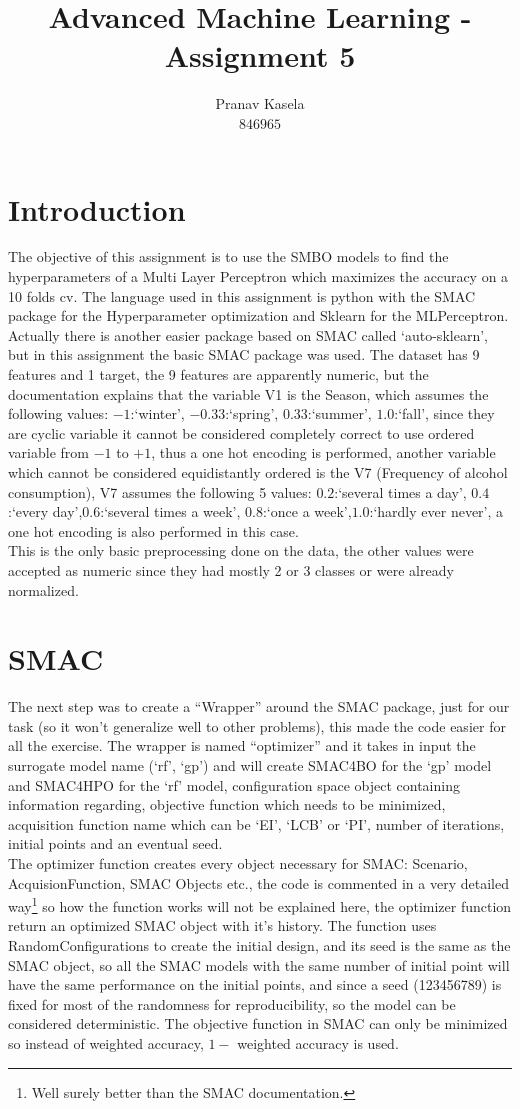 \documentclass[12pt, onecolumn]{article}
\title{Advanced Machine Learning - Assignment 5}
\author{Pranav Kasela \\$846965$}
\date{}
\begin{document}
\maketitle
\section*{Introduction}
The objective of this assignment is to use the SMBO models to find the hyperparameters of a Multi Layer Perceptron which maximizes the accuracy on a 10 folds cv.
The language used in this assignment is python with the SMAC package for the Hyperparameter optimization and Sklearn for the MLPerceptron.
Actually there is another easier package based on SMAC called `auto-sklearn', but in this assignment the basic SMAC package was used.
The dataset has 9 features and 1 target, the 9 features are apparently numeric, but the documentation explains that the variable V1 is the Season, which assumes the following values: $-1$:`winter', $-0.33$:`spring', $0.33$:`summer', $1.0$:`fall', since they are cyclic variable it cannot be considered completely correct to use ordered variable from $-1$ to $+1$, thus a one hot encoding is performed, another variable which cannot be considered equidistantly ordered is the V7 (Frequency of alcohol consumption), V7 assumes the following 5 values: $0.2$:`several times a day', $0.4$:`every day',$0.6$:`several times a week',  $0.8$:`once a week',$1.0$:`hardly ever never', a one hot encoding is also performed in this case.\\
This is the only basic preprocessing done on the data, the other values were accepted as numeric since they had mostly 2 or 3 classes or were already normalized.

\section*{SMAC}
The next step was to create a ``Wrapper'' around the SMAC package, just for our task (so it won't generalize well to other problems), this made the code easier for all the exercise.
The wrapper is named ``optimizer'' and it takes in input the surrogate model name (`rf', `gp') and will create SMAC4BO for the `gp' model and SMAC4HPO for the `rf' model, configuration space object containing information regarding, objective function which needs to be minimized, acquisition function name which can be `EI', `LCB' or `PI', number of iterations, initial points and an eventual seed.\\
The optimizer function creates every object necessary for SMAC: Scenario, AcquisionFunction, SMAC Objects etc., the code is commented in a very detailed way\footnote{Well surely better than the SMAC documentation.} so how the function works will not be explained here, the optimizer function return an optimized SMAC object with it's history.
The function uses RandomConfigurations to create the initial design, and its seed is the same as the SMAC object, so all the SMAC models with the same number of initial point will have the same performance on the initial points, and since a seed (123456789) is fixed for most of the randomness for reproducibility, so the model can be considered deterministic.
The objective function in SMAC can only be minimized so instead of weighted accuracy, $1 -$ weighted accuracy is used.
\end{document}
